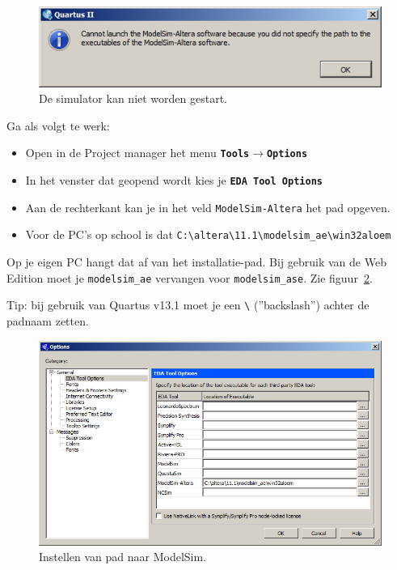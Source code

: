 \documentclass[a4paper,12pt,fleqn,twoside]{book}
\def\tutpicscale{0.455}
\newcommand{\menu}[1]{\texttt{\textbf{#1}}}
\newcommand{\naam}[1]{\texttt{#1}}
\def\pijl{$\rightarrow$}%
\begin{document}
\begin{figure}[H]
\centering
\includegraphics[scale=\tutpicscale]{210modelsimpath_121.png}
\caption{De simulator kan niet worden gestart.}
\label{fig:210modelsimpath_121}
\end{figure}

Ga als volgt te werk:

\begin{itemize}\itemsep-1pt
\item Open in de Project manager het menu \menu{Tools\pijl{}Options}
\item In het venster dat geopend wordt kies je \menu{EDA Tool Options}
\item Aan de rechterkant kan je in het veld \naam{ModelSim-Altera} het pad opgeven.
\item Voor de PC's op school is dat \lstinline|C:\altera\11.1\modelsim_ae\win32aloem|
\end{itemize}

Op je eigen PC hangt dat af van het installatie-pad. Bij gebruik van de Web
Edition moet je \naam{modelsim\_ae} vervangen voor \naam{modelsim\_ase}. Zie
figuur~\ref{fig:212modelsimpath2}.

Tip: bij gebruik van Quartus v13.1 moet je een \lstinline|\| (''backslash'')
achter de padnaam zetten.

\begin{figure}[H]
\centering
\includegraphics[scale=\tutpicscale]{212modelsimpath2.png}
\caption{Instellen van pad naar ModelSim.}
\label{fig:212modelsimpath2}
\end{figure}
\end{document}
